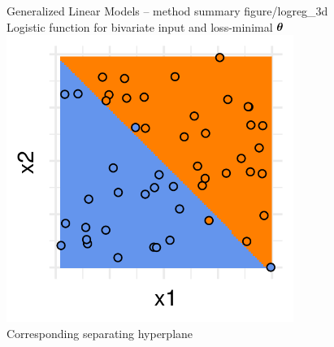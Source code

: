 \documentclass[11pt,compress,t,notes=noshow, xcolor=table]{beamer}
\begin{document}
\begin{frame2}{Generalized Linear Models -- method summary}
{{    figure/logreg_3d}\\
    \tiny{Logistic function for bivariate input and loss-minimal $\bm{\theta}$}
}{
  \includegraphics[width=0.7\textwidth]{figure/logreg_2d}\\
    \tiny{Corresponding separating hyperplane}
}
\end{frame2}
\end{document}
